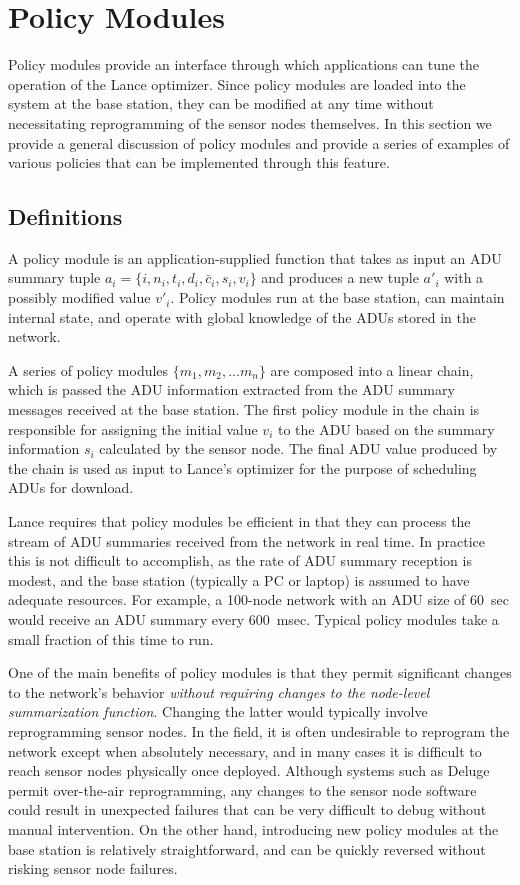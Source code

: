 \section{Policy Modules}
\label{lance-sec-policies}

Policy modules provide an interface through 
which applications can tune the operation of the Lance optimizer.
Since policy modules are loaded into the system
at the base station, they can be modified at any time without 
necessitating reprogramming of the sensor nodes themselves.
In this section we provide a general discussion of policy modules and
provide a series of examples of various policies that can be implemented
through this feature. 

\subsection{Definitions}

A policy module is an application-supplied function that takes as input an
ADU summary tuple $a_i = \{ i, n_i, t_i, d_i, \bar{c}_i, s_i, v_i \}$ and
produces a new tuple $a'_i$ with a possibly modified value $v'_i$.  Policy
modules run at the base station, can maintain internal state, and operate
with global knowledge of the ADUs stored in the network. 

A series of policy modules $\{m_1, m_2, ... m_n\}$ are composed into a 
linear chain, which is passed the 
ADU information extracted from the ADU summary messages received at
the base station. The first policy module in the chain is responsible
for assigning the initial value $v_i$ to the ADU based on the summary 
information $s_i$ calculated by the sensor node. 
The final ADU value produced by the chain is used as input to 
Lance's optimizer for the purpose of scheduling ADUs for download.

Lance requires that policy modules be efficient in that
they can process the stream of ADU summaries received from the
network in real time. In practice this is not difficult to accomplish,
as the rate of ADU summary reception is modest, and the base
station (typically a PC or laptop) is assumed to have adequate
resources. For example, a 100-node network with an ADU size of 60~sec 
would receive an ADU summary every 600~msec. Typical policy modules
take a small fraction of this time to run. 

One of the main benefits of policy modules is that they permit 
significant changes to the network's behavior {\em without requiring
changes to the node-level summarization function}. Changing the
latter would typically involve reprogramming sensor nodes. 
In the field, it is often undesirable to reprogram the network 
except when absolutely necessary, and in many cases it is difficult to 
reach sensor nodes physically once deployed. Although systems such as 
Deluge~\cite{deluge} permit over-the-air reprogramming, 
any changes to the sensor node software could result in unexpected
failures that can be very difficult to debug without manual intervention. 
On the other hand, introducing new policy modules at the base station 
is relatively straightforward, and can be quickly reversed without 
risking sensor node failures. 

